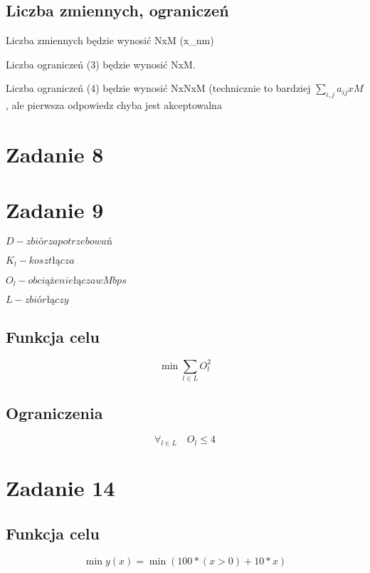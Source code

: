 \documentclass{article}
\begin{document}
\subsection{Liczba zmiennych, ograniczeń}

Liczba zmiennych będzie wynosić NxM (x_{nm})

Liczba ograniczeń (3) będzie wynosić NxM.

Liczba ograniczeń (4) będzie wynosić NxNxM (technicznie to bardziej $\sum_{i,j} a_{ij} x M$, ale pierwsza odpowiedz chyba jest akceptowalna


\section{Zadanie 8}


\section{Zadanie 9}

$D - zbiór zapotrzebowań$

$K_l - koszt łącza$

$O_l - obciążenie łącza w Mbps$

$L - zbiór łączy$

\subsection{Funkcja celu}
\begin{equation}
\min \sum_{l \in L} O_l^2
\end{equation}


\subsection{Ograniczenia}

\begin{equation}
  \forall_{l \in L} \quad O_l \leq 4
\end{equation}

\section{Zadanie 14}

\subsection{Funkcja celu}

\begin{equation}
  \min y(x) = \min (100 * (x > 0) + 10 * x )
\end{equation}
\end{document}
